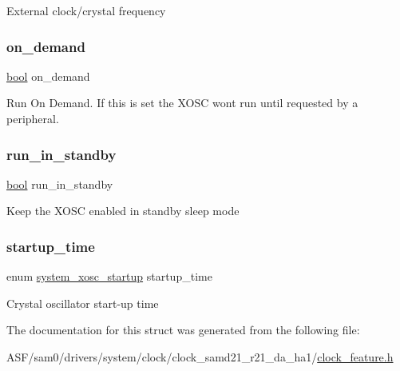 External clock/crystal frequency \mbox{\label{structsystem__clock__source__xosc__config_a23620c12634b9230d2325ec5c245cf32}} 
\subsubsection{\texorpdfstring{on\_demand}{on\_demand}}
{\footnotesize\ttfamily \mbox{\hyperlink{group__group__sam0__utils_ga97a80ca1602ebf2303258971a2c938e2}{bool}} on\+\_\+demand}

Run On Demand. If this is set the X\+O\+SC won\textquotesingle{}t run until requested by a peripheral. \mbox{\label{structsystem__clock__source__xosc__config_a514964d5c2a8da4dd96bac82a53477f2}} 
\subsubsection{\texorpdfstring{run\_in\_standby}{run\_in\_standby}}
{\footnotesize\ttfamily \mbox{\hyperlink{group__group__sam0__utils_ga97a80ca1602ebf2303258971a2c938e2}{bool}} run\+\_\+in\+\_\+standby}

Keep the X\+O\+SC enabled in standby sleep mode \mbox{\label{structsystem__clock__source__xosc__config_a147400a478d23555be9e54624a0251ca}} 
\subsubsection{\texorpdfstring{startup\_time}{startup\_time}}
{\footnotesize\ttfamily enum \mbox{\hyperlink{group__asfdoc__sam0__system__clock__group_ga93797ad2901b27dd84fa8b7edc9bb5c5}{system\+\_\+xosc\+\_\+startup}} startup\+\_\+time}

Crystal oscillator start-\/up time 

The documentation for this struct was generated from the following file\+:\begin{DoxyCompactItemize}
\item 
A\+S\+F/sam0/drivers/system/clock/clock\+\_\+samd21\+\_\+r21\+\_\+da\+\_\+ha1/\mbox{\hyperlink{clock__feature_8h}{clock\+\_\+feature.\+h}}\end{DoxyCompactItemize}
